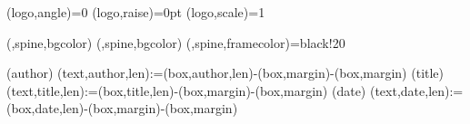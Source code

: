(logo,angle)={0}
(logo,raise)={0pt}
(logo,scale)={1}

(,spine,bgcolor){}{%
  (,spine,bgcolor){}{%
    (,spine,framecolor)={black!20}%
  }%
}%


(author){%
  \spine(text,author,len):={\dimexpr\thespine(box,author,len)-\thespine(box,margin)-\thespine(box,margin)}
}{}
(title){%
  \spine(text,title,len):={\dimexpr\thespine(box,title,len)-\thespine(box,margin)-\thespine(box,margin)}
}{}
(date){%
  \spine(text,date,len):={\dimexpr\thespine(box,date,len)-\thespine(box,margin)-\thespine(box,margin)}
}{}


\newcommand{\@spinetextalin}[1]{%
  \raggedright%
  \IfStrEqCase{\thespine(box,#1,align)}{%
    {l}{\raggedright}%
    {c}{\centering}%
    {r}{\raggedleft}%
  }%
}

\newcommand{\@spinetextcolor}[1]{%
  \ifdatadefinedor{\arg}{spine}({box,#1,textcolor},{box,textcolor}){%
    \color{\thespine(\arg)}%
  }{}%
}

